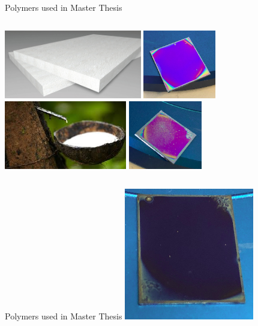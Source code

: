 \documentclass[10pt]{beamer}
\begin{document}
\begin{frame}{Polymers used in Master Thesis}    
    \begin{columns}[t]
        \includegraphics[width=\columnwidth,height=3cm]{pswebsite.jpg}
        \includegraphics[width=\columnwidth,height=3cm]{PSphoto1.png}
        \includegraphics[width=\columnwidth,height=3cm]{piwebsite.jpeg}
        \includegraphics[width=\columnwidth,height=3cm]{PIphoto1.png}
    \end{columns}
\end{frame}

\begin{frame}{Polymers used in Master Thesis}
\centering
\includegraphics[scale=0.8]{PSbPIBsva.png}
\end{frame}
\end{document}
